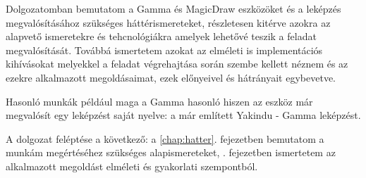 Dolgozatomban bemutatom a Gamma és MagicDraw eszközöket és a leképzés megvalósításához szükséges háttérismereteket, részletesen kitérve azokra az alapvető ismeretekre és tehcnológiákra amelyek lehetővé teszik a feladat megvalósítását. Továbbá ismertetem azokat az elméleti is implementációs kihívásokat melyekkel a feladat végrehajtása során szembe kellett néznem és az ezekre alkalmazott megoldásaimat, ezek előnyeivel és hátrányait egybevetve.

Hasonló munkák például maga a Gamma hasonló hiszen az eszköz már megvalósít egy leképzést saját nyelve: a már említett Yakindu - Gamma leképzést.

A dolgozat feléptése a következő: a \ref{chap:hatter}. fejezetben bemutatom a munkám megértéséhez szükséges alapismereteket, . fejezetben ismertetem az alkalmazott megoldást elméleti és gyakorlati szempontból.


